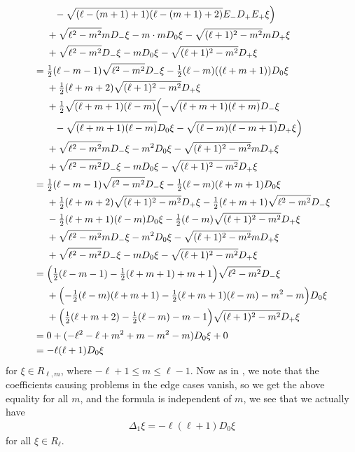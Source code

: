 \begin{align*}
  &\phantom{{}={}()}{} - \sqrt{(\ell-(m+1)+1)(\ell-(m+1)+2)}E_-D_+E_+\xi \Bigr) \\*
  &\phantom{{}={}}{} + \sqrt{\ell^2-m^2} mD_-\xi - m \cdot m D_0\xi - \sqrt{(\ell+1)^2-m^2}mD_+\xi \\*
  &\phantom{{}={}}{} + \sqrt{\ell^2-m^2} D_-\xi - m D_0\xi - \sqrt{(\ell+1)^2-m^2}D_+\xi \\
  &= \tfrac{1}{2}(\ell-m-1)\sqrt{\ell^2-m^2} D_-\xi - \tfrac{1}{2}(\ell-m)((\ell+m+1))D_0\xi \\*
  &\phantom{{}={}}{} + \tfrac{1}{2}(\ell+m+2)\sqrt{(\ell+1)^2-m^2}D_+\xi \\*
  &\phantom{{}={}}{} + \tfrac{1}{2}\sqrt{(\ell+m+1)(\ell-m)}\Bigl(-\sqrt{(\ell+m+1)(\ell+m)}D_-\xi \\*
  &\phantom{{}={}()}{} - \sqrt{(\ell+m+1)(\ell-m)}D_0\xi - \sqrt{(\ell-m)(\ell-m+1)}D_+\xi \Bigr) \\*
  &\phantom{{}={}}{} + \sqrt{\ell^2-m^2} mD_-\xi - m^2 D_0\xi - \sqrt{(\ell+1)^2-m^2}mD_+\xi \\*
  &\phantom{{}={}}{} + \sqrt{\ell^2-m^2} D_-\xi - m D_0\xi - \sqrt{(\ell+1)^2-m^2}D_+\xi \\
  &= \tfrac{1}{2}(\ell-m-1)\sqrt{\ell^2-m^2} D_-\xi - \tfrac{1}{2}(\ell-m)(\ell+m+1)D_0\xi \\*
  &\phantom{{}={}}{} + \tfrac{1}{2}(\ell+m+2)\sqrt{(\ell+1)^2-m^2}D_+\xi  - \tfrac{1}{2}(\ell+m+1)\sqrt{\ell^2-m^2}D_-\xi \\*
  &\phantom{{}={}}{}  - \tfrac{1}{2}(\ell+m+1)(\ell-m)D_0\xi  - \tfrac{1}{2}(\ell-m)\sqrt{(\ell+1)^2-m^2}D_+\xi \\*
  &\phantom{{}={}}{} + \sqrt{\ell^2-m^2} mD_-\xi - m^2 D_0\xi - \sqrt{(\ell+1)^2-m^2}mD_+\xi \\*
  &\phantom{{}={}}{} + \sqrt{\ell^2-m^2} D_-\xi - m D_0\xi - \sqrt{(\ell+1)^2-m^2}D_+\xi \\
  &= \Bigl( \tfrac{1}{2}(\ell-m-1) - \tfrac{1}{2}(\ell+m+1) + m + 1 \Bigr)\sqrt{\ell^2-m^2}D_- \xi \\*
  &\phantom{{}={}}{} + \Bigl( -\tfrac{1}{2}(\ell-m)(\ell+m+1) - \tfrac{1}{2}(\ell+m+1)(\ell-m) - m^2 - m  \Bigr)D_0 \xi \\*
  &\phantom{{}={}}{} + \Bigl( \tfrac{1}{2}(\ell+m+2) - \tfrac{1}{2}(\ell-m) - m - 1  \Bigr)\sqrt{(\ell+1)^2-m^2}D_+ \xi \\
  &= 0 + (-\ell^2-\ell+m^2+m-m^2-m)D_0\xi + 0 \\
  &= -\ell(\ell+1)D_0\xi
\end{align*}
for $\xi\in R_{\ell,m}$, where $-\ell+1\leq m\leq \ell-1$. Now as in , we note that the coefficients causing problems in the edge cases vanish, so we get the above equality for all $m$, and the formula is independent of $m$, we see that we actually have
\begin{align*}
  \Delta_1 \xi = -\ell(\ell+1)D_0 \xi
\end{align*}
for all $\xi\in R_\ell$.

